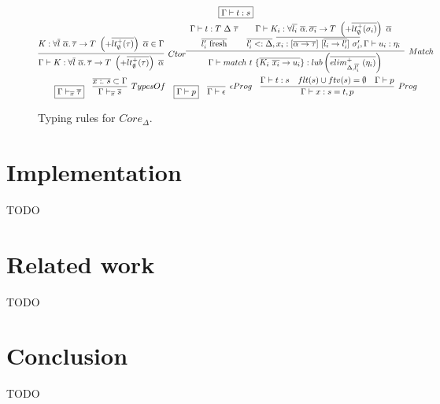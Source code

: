 \documentclass[11pt]{article}
\newcommand{\mathframebox}[1]{\framebox{$\displaystyle #1$}}
\newcommand{\ap}{~}
\begin{document}
    \begin{figure}
        \begin{gather*}
            \mathframebox{\Gamma\vdash t : s} \\
            \infer[Ctor]{\Gamma\vdash K : \forall\overline{l}\ \overline{\alpha}\ldotp \overline{\tau}\to T \ap\left(+\overline{lt_\emptyset^+(\tau)}\right)\ap \overline{\alpha}}{K : \forall\overline{l}\ \overline{\alpha}\ldotp \overline{\tau}\to T \ap\left(+\overline{lt_\emptyset^+(\tau)}\right)\ap \overline{\alpha} \in \Gamma}
            \infer[Match]{
                \Gamma\vdash match ~ t ~\{ \overline{K_i\ap \overline{x_{i}} \to u_i }\}  : lub\left(\overline{elim_{\Delta, \overline{l_i'}}^+\ap(\eta_i)}\right)
            }{
                \begin{array}{cc}
                    \Gamma\vdash t : T\ap\Delta \ap\overline{\tau}
                    &
                    \Gamma\vdash K_i : \forall \overline{l_i}~\overline{\alpha}\ldotp \overline{\sigma_{i}} \to T\ap\left(+\overline{lt_\emptyset^+(\sigma_i)}\right)\ap\overline{\alpha}
                    \\
                    \overline{l_i' \text{ fresh}}
                    &
                    \overline{l_i' <: \Delta}, \overline{x_i : [\overline{\alpha\to\tau}]\ap[\overline{l_i\to l_i'}]\ap\sigma_i'}, \Gamma \vdash u_i : \eta_i
                \end{array}
            }\\
            \begin{array}{ccccc}
                \mathframebox{\Gamma\vdash_{\overline{x}}\overline{\tau}} &
                \infer[TypesOf]{\Gamma\vdash_{\overline{x}}\overline{s}}{\overline{x :_\cdot s} \subset \Gamma} &
                \mathframebox{\Gamma\vdash p} &
                \infer[\epsilon Prog]{\Gamma\vdash\epsilon}{} &
                \infer[Prog]{
                    \Gamma\vdash x : s = t, p
                }{
                    \Gamma\vdash t : s &
                    flt(s)\cup ftv(s) = \emptyset &
                    \Gamma\vdash p
                }
            \end{array}
        \end{gather*}
        \caption{Typing rules for $Core_{\Delta}$.}
        \label{fig:core-delta-typing}
    \end{figure}


    \section{Implementation}

    TODO %


    \section{Related work}

    TODO %


    \section{Conclusion}

    TODO %

    
    
\end{document}
